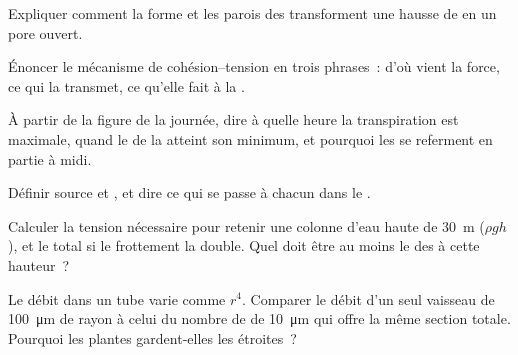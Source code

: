 \begin{exercise}[$\star$]\label{exo:b1:plant-transport:1}
Expliquer comment la forme et les parois des 
transforment une hausse de  en un pore ouvert.
\end{exercise}

\begin{exercise}[$\star$]\label{exo:b1:plant-transport:2}
Énoncer le mécanisme de cohésion--tension en trois phrases~: d'où vient
la force, ce qui la transmet, ce qu'elle fait à la .
\end{exercise}

\begin{exercise}[$\star$]\label{exo:b1:plant-transport:3}
À partir de la figure de la journée, dire à quelle heure la
transpiration est maximale, quand le  de la 
atteint son minimum, et pourquoi les  se referment en partie à
midi.
\end{exercise}

\begin{exercise}[$\star$]\label{exo:b1:plant-transport:4}
Définir source et , et dire ce qui se passe à chacun dans le
.
\end{exercise}

\begin{exercise}[$\star\star$]\label{exo:b1:plant-transport:5}
Calculer la tension nécessaire pour retenir une colonne d'eau haute de
\qty{30}{m} ($\rho g h$), et le total si le frottement la double. Quel
doit être au moins le  des  à cette hauteur~?
\end{exercise}

\begin{exercise}[$\star\star$]\label{exo:b1:plant-transport:6}
Le débit dans un tube varie comme $r^4$. Comparer le débit d'un seul
vaisseau de \qty{100}{\micro m} de rayon à celui du nombre de
 de \qty{10}{\micro m} qui offre la même section totale.
Pourquoi les plantes gardent-elles les étroites~?
\end{exercise}


